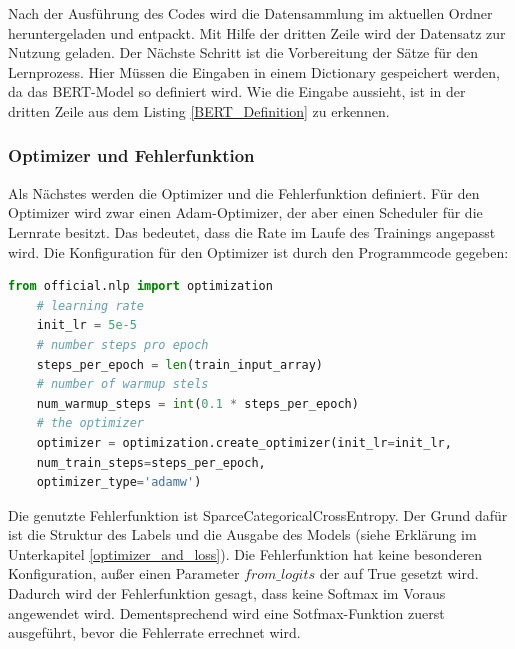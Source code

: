 Nach der Ausführung des Codes wird die Datensammlung im aktuellen Ordner heruntergeladen und entpackt. Mit Hilfe der dritten Zeile wird der Datensatz zur Nutzung geladen. Der Nächste Schritt ist die Vorbereitung der Sätze für den Lernprozess. Hier Müssen die Eingaben in einem Dictionary gespeichert werden, da das BERT-Model so definiert wird. Wie die Eingabe aussieht, ist in der dritten Zeile aus dem Listing \ref{BERT_Definition} zu erkennen.

\subsubsection{Optimizer und Fehlerfunktion}

Als Nächstes werden die Optimizer und die Fehlerfunktion definiert. Für den Optimizer wird zwar einen Adam-Optimizer, der aber einen Scheduler für die Lernrate besitzt. Das bedeutet, dass die Rate im Laufe des Trainings angepasst wird. Die Konfiguration für den Optimizer ist durch den Programmcode gegeben:

\begin{lstlisting}[language=Python, caption={BERT Optimizer}]
	from official.nlp import optimization
	# learning rate
	init_lr = 5e-5
	# number steps pro epoch
	steps_per_epoch = len(train_input_array)
	# number of warmup stels
	num_warmup_steps = int(0.1 * steps_per_epoch)
	# the optimizer
	optimizer = optimization.create_optimizer(init_lr=init_lr,
	num_train_steps=steps_per_epoch,
	optimizer_type='adamw')
\end{lstlisting}

Die genutzte Fehlerfunktion ist SparceCategoricalCrossEntropy. Der Grund dafür ist die Struktur des Labels und die Ausgabe des Models (siehe Erklärung im Unterkapitel \ref{optimizer_and_loss}). Die Fehlerfunktion hat keine besonderen Konfiguration, außer einen Parameter $\textit{from\_logits}$ der auf True gesetzt wird. Dadurch wird der Fehlerfunktion gesagt, dass keine Softmax im Voraus angewendet wird. Dementsprechend wird eine Sotfmax-Funktion zuerst ausgeführt, bevor die Fehlerrate errechnet wird.
